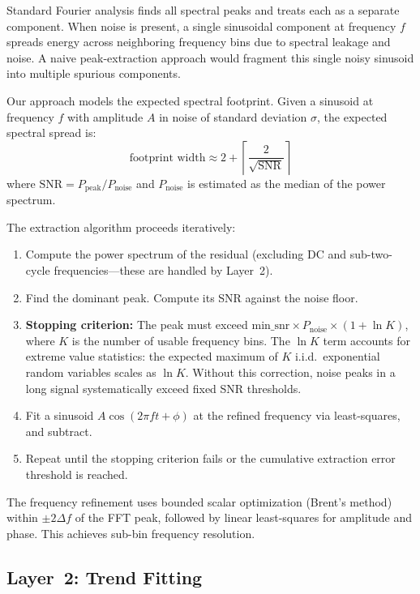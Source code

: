 \documentclass[sigconf,nonacm]{acmart}
\begin{document}
Standard Fourier analysis finds all spectral peaks and treats each as a separate component. When noise is present, a single sinusoidal component at frequency $f$ spreads energy across neighboring frequency bins due to spectral leakage and noise. A naive peak-extraction approach would fragment this single noisy sinusoid into multiple spurious components.

Our approach models the expected spectral footprint. Given a sinusoid at frequency $f$ with amplitude $A$ in noise of standard deviation $\sigma$, the expected spectral spread is:
\begin{equation}
\text{footprint width} \approx 2 + \left\lceil \frac{2}{\sqrt{\text{SNR}}} \right\rceil
\end{equation}
where $\text{SNR} = P_{\text{peak}} / P_{\text{noise}}$ and $P_{\text{noise}}$ is estimated as the median of the power spectrum.

The extraction algorithm proceeds iteratively:
\begin{enumerate}
\item Compute the power spectrum of the residual (excluding DC and sub-two-cycle frequencies---these are handled by Layer~2).
\item Find the dominant peak. Compute its SNR against the noise floor.
\item \textbf{Stopping criterion:} The peak must exceed $\text{min\_snr} \times P_{\text{noise}} \times (1 + \ln K)$, where $K$ is the number of usable frequency bins. The $\ln K$ term accounts for extreme value statistics: the expected maximum of $K$ i.i.d.\ exponential random variables scales as $\ln K$. Without this correction, noise peaks in a long signal systematically exceed fixed SNR thresholds.
\item Fit a sinusoid $A \cos(2\pi f t + \phi)$ at the refined frequency via least-squares, and subtract.
\item Repeat until the stopping criterion fails or the cumulative extraction error threshold is reached.
\end{enumerate}

The frequency refinement uses bounded scalar optimization (Brent's method) within $\pm 2\Delta f$ of the FFT peak, followed by linear least-squares for amplitude and phase. This achieves sub-bin frequency resolution.

\subsection{Layer~2: Trend Fitting}
\end{document}
